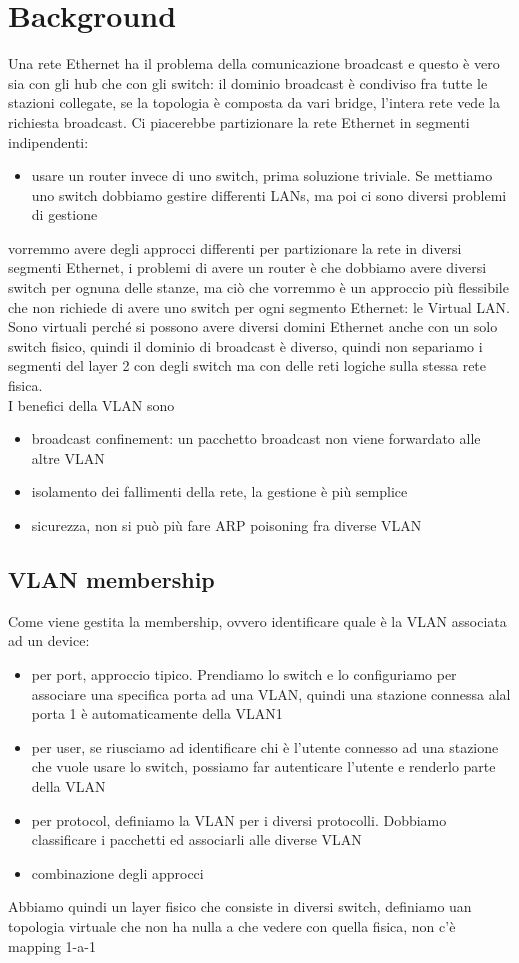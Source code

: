 \documentclass[12pt, oneside]{extbook} %
\begin{document}
\section{Background}
Una rete Ethernet ha il problema della comunicazione broadcast e questo è vero sia con gli hub che con gli switch: il dominio broadcast è condiviso fra tutte le stazioni collegate, se la topologia è composta da vari bridge, l'intera rete vede la richiesta broadcast. Ci piacerebbe partizionare la rete Ethernet in segmenti indipendenti:
\begin{itemize}
\item usare un router invece di uno switch, prima soluzione triviale. Se mettiamo uno switch dobbiamo gestire differenti LANs, ma poi ci sono diversi problemi di gestione
\end{itemize}
vorremmo avere degli approcci differenti per partizionare la rete in diversi segmenti Ethernet, i problemi di avere un router è che dobbiamo avere diversi switch per ognuna delle stanze, ma ciò che vorremmo è un approccio più flessibile che non richiede di avere uno switch per ogni segmento Ethernet: le Virtual LAN. Sono virtuali perché si possono avere diversi domini Ethernet anche con un solo switch fisico, quindi il dominio di broadcast è diverso, quindi non separiamo i segmenti del layer 2 con degli switch ma con delle reti logiche sulla stessa rete fisica.\\ I benefici della VLAN sono
\begin{itemize}
\item broadcast confinement: un pacchetto broadcast non viene forwardato alle altre VLAN
\item isolamento dei fallimenti della rete, la gestione è più semplice
\item sicurezza, non si può più fare ARP poisoning fra diverse VLAN 
\end{itemize}
\subsection{VLAN membership}
Come viene gestita la membership, ovvero identificare quale è la VLAN associata ad un device:
\begin{itemize}
\item per port, approccio tipico. Prendiamo lo switch e lo configuriamo per associare una specifica porta ad una VLAN, quindi una stazione connessa alal porta 1 è automaticamente della VLAN1
\item per user, se riusciamo ad identificare chi è l'utente connesso ad una stazione che vuole usare lo switch, possiamo far autenticare l'utente e renderlo parte della VLAN
\item per protocol, definiamo la VLAN per i diversi protocolli. Dobbiamo classificare i pacchetti ed associarli alle diverse VLAN
\item combinazione degli approcci
\end{itemize}
Abbiamo quindi un layer fisico che consiste in diversi switch, definiamo uan topologia virtuale che non ha nulla a che vedere con quella fisica, non c'è mapping 1-a-1
\end{document}
